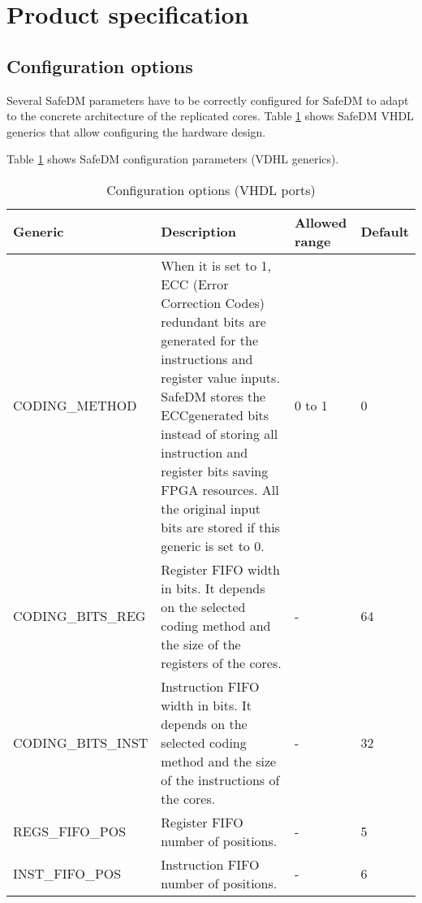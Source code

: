 \section{Product specification}



\subsection{Configuration options}
\label{confg_chap}

Several SafeDM parameters have to be correctly configured for SafeDM to adapt to the concrete architecture of the replicated cores. Table \ref{generics} shows SafeDM VHDL generics that allow configuring the hardware design.

Table \ref{generics} shows SafeDM configuration parameters (VDHL generics). 
\\
\begin{table}[H]
	\caption{Configuration options (VHDL ports)}
	\label{generics}
	\centering
	\begin{small}
		\begin{tabular}{|l|p{6cm}|l|l|}
			\hline
			\textbf{Generic} & \textbf{Description}  & \textbf{Allowed range}  & \textbf{Default}\\
			\hline
			CODING\_METHOD   & When it is set to 1, ECC (Error Correction Codes) redundant bits are generated for the instructions and register value inputs. SafeDM stores the ECC\-generated bits instead of storing all  instruction and register bits saving FPGA resources.  All the original input bits are stored if this generic is set to 0. & 0 to 1 & 0\\
			\hline
			CODING\_BITS\_REG  & Register FIFO width in bits. It depends on the selected coding method and the size of the registers of the cores. & - & 64\\
			\hline
			CODING\_BITS\_INST & Instruction FIFO width in bits. It depends on the selected coding method and the size of the instructions of the cores. & - & 32\\
			\hline
			REGS\_FIFO\_POS    & Register FIFO number of positions. & - & 5\\
			\hline
			INST\_FIFO\_POS    & Instruction FIFO number of positions. & - & 6\\
			\hline
		\end{tabular}
	\end{small}
\end{table}


